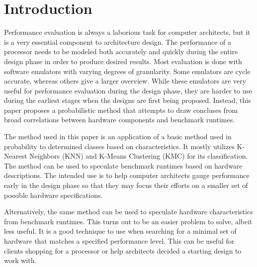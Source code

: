 \documentclass[10pt,twocolumn,letterpaper]{article}
\begin{document}
\section{Introduction}

Performance evaluation is always a laborious task for computer architects, but it is a very essential component to architecture design.
The performance of a processor needs to be modeled both accurately and quickly during the entire design phase in order to produce desired results.
Most evaluation is done with software emulators with varying degrees of granularity.
Some emulators are cycle accurate, whereas others give a larger overview.
While these emulators are very useful for performance evaluation during the design phase, they are harder to use during the earliest stages when the designs are first being proposed.
Instead, this paper proposes a probabilistic method that attempts to draw concluses from broad correlations between hardware components and benchmark runtimes.


The method used in this paper is an application of a basic method used in probability to determined classes based on characteristics.
It mostly utilizes K-Nearest Neighbors (KNN) and K-Means Clustering (KMC) for its classification.
The method can be used to speculate benchmark runtimes based on hardware descriptions.
The intended use is to help computer architects gauge performance early in the design phase so that they may focus their efforts on a smaller set of possible hardware specifications.

Alternatively, the same method can be used to speculate hardware characteristics from benchmark runtimes.
This turns out to be an easier problem to solve, albeit less useful.
It is a good technique to use when searching for a minimal set of hardware that matches a specified performance level.
This can be useful for clients shopping for a processor or help architects decided a starting design to work with.
\end{document}
